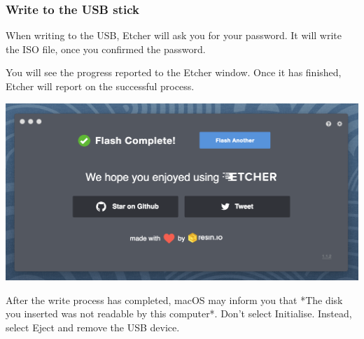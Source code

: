 \subsubsection{Write to the USB stick}

When writing to the USB, Etcher will ask you for your password. It will
write the ISO file, once you confirmed the password.

You will see the progress reported to the Etcher window. Once it has
finished, Etcher will report on the successful process.

\includegraphics[width=0.8\columnwidth]{images/4207a01ff6afea52.png}

\begin{WARNING}

After the write process has completed, macOS may inform you that *The
disk you inserted was not readable by this computer*. Don't select
Initialise. Instead, select Eject and remove the USB device.

\end{WARNING}

